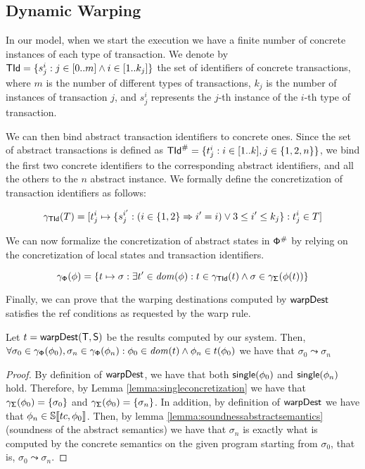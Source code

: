\subsection{Dynamic Warping}

In our model, when we start the execution we have a finite number of concrete instances of each type of transaction. We denote by $\mathsf{TId} = \{s^i_j : j \in [0..m] \land i \in [1..k_j]\}$ the set of identifiers of concrete transactions, where $m$ is the number of different types of transactions, $k_j$ is the number of instances of transaction $j$, and $s^i_j$ represents the $j$-th instance of the $i$-th type of transaction.

We can then bind abstract transaction identifiers to concrete ones. Since the set of abstract transactions is defined as $\mathsf{\mathsf{TId}}^\# = \{t^i_j : i \in [1..k], j \in \{1, 2, n\}\}$, we bind the first two concrete identifiers to the corresponding abstract identifiers, and all the others to the $n$ abstract instance. We formally define the concretization of transaction identifiers as follows:

\[
\gamma_{\mathsf{TId}}(T) =
[
t^i_j \mapsto 
\{
s^{i'}_j : (i \in \{1, 2\} \Rightarrow i'=i) \lor 3\leq i' \leq k_j
\} : t^i_j \in T
]
\]

We can now formalize the concretization of abstract states in $\mathsf{\mathsf{\Phi}}^\#$ by relying on the concretization of local states and transaction identifiers.

\[
\gamma_{\mathsf{\Phi}}(\phi) = \{t \mapsto \sigma : \exists t' \in \mathit{dom}(\phi) : t \in \gamma_{\mathsf{TId}}(t) \land \sigma \in \gamma_{\mathsf{\Sigma}}(\phi(t))\}
\]

Finally, we can prove that the warping destinations computed by $\mathsf{warpDest}$ satisfies the {\sf ref} conditions as requested by the {\sf warp} rule.

\begin{theorem}
	Let $t=\mathsf{warpDest}(\mathsf{T}, \mathsf{S})$ be the results computed by our system. Then, $\forall \sigma_0 \in \gamma_{\mathsf{\Phi}}(\phi_0), \sigma_n \in \gamma_{\mathsf{\Phi}}(\phi_n) : \phi_0 \in \mathit{dom}(t) \land \phi_n \in t(\phi_0)$ we have that $\sigma_0 \leadsto \sigma_n$
\end{theorem}
\begin{proof}
By definition of $\mathsf{warpDest}$, we have that both $\mathsf{single}(\phi_0)$ and $\mathsf{single}(\phi_n)$ hold. Therefore, by Lemma \ref{lemma:singleconcretization} we have that $\gamma_{\mathsf{\Sigma}}(\phi_0) = \{\sigma_0\}$ and $\gamma_{\mathsf{\Sigma}}(\phi_0) = \{\sigma_n\}$. In addition, by definition of $\mathsf{warpDest}$ we have that $\phi_n \in \mathbb{S}\llbracket tc, \phi_0 \rrbracket$. Then, by lemma \ref{lemma:soundnessabstractsemantics} (soundness of the abstract semantics) we have that $\sigma_n$ is exactly what is computed by the concrete semantics on the given program starting from $\sigma_0$, that is, $\sigma_0 \leadsto \sigma_n$. 
\end{proof}


